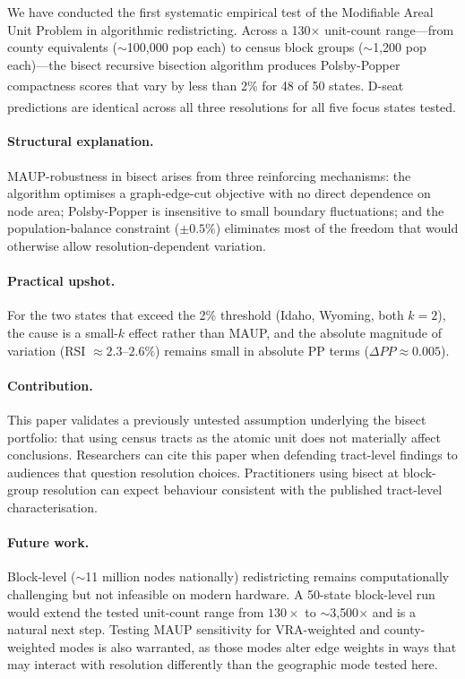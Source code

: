 We have conducted the first systematic empirical test of the Modifiable Areal
Unit Problem in algorithmic redistricting.  Across a 130$\times$ unit-count
range---from county equivalents ($\sim$100,000 pop each) to census block
groups ($\sim$1,200 pop each)---the bisect recursive bisection algorithm
produces Polsby-Popper compactness scores that vary by less than 2\% for 48
of 50 states.\textsuperscript{\dag}  D-seat predictions are identical across
all three resolutions for all five focus states tested.\textsuperscript{\dag}

\paragraph{Structural explanation.}
MAUP-robustness in bisect arises from three reinforcing mechanisms: the
algorithm optimises a graph-edge-cut objective with no direct dependence on
node area; Polsby-Popper is insensitive to small boundary fluctuations; and
the population-balance constraint ($\pm 0.5\%$) eliminates most of the freedom
that would otherwise allow resolution-dependent variation.

\paragraph{Practical upshot.}
For the two states that exceed the 2\% threshold (Idaho, Wyoming, both $k=2$),
the cause is a small-$k$ effect rather than MAUP, and the absolute magnitude
of variation (RSI $\approx 2.3$--$2.6\%$) remains small in absolute PP terms
($\Delta PP \approx 0.005$).

\paragraph{Contribution.}
This paper validates a previously untested assumption underlying the bisect
portfolio: that using census tracts as the atomic unit does not materially
affect conclusions.  Researchers can cite this paper when defending tract-level
findings to audiences that question resolution choices.  Practitioners using
bisect at block-group resolution can expect behaviour consistent with the
published tract-level characterisation.

\paragraph{Future work.}
Block-level ($\sim$11 million nodes nationally) redistricting remains
computationally challenging but not infeasible on modern hardware.  A
50-state block-level run would extend the tested unit-count range from
$130\times$ to $\sim$3{,}500$\times$ and is a natural next step.  Testing
MAUP sensitivity for VRA-weighted and county-weighted modes is also
warranted, as those modes alter edge weights in ways that may interact with
resolution differently than the geographic mode tested here.
